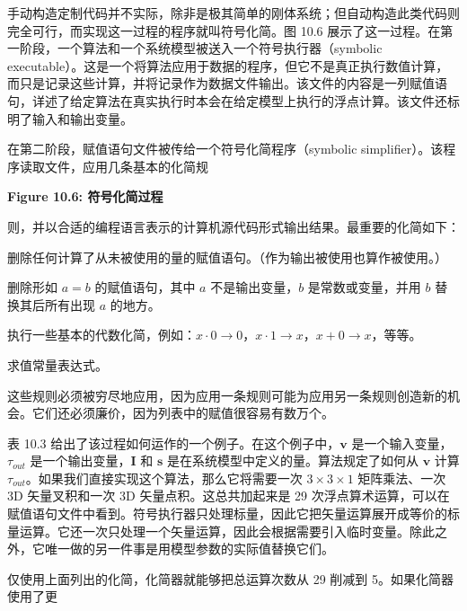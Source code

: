 \documentclass[10pt,a4paper]{book}
\theoremstyle{thmstyle} %
\theoremstyle{defstyle} %
\theoremstyle{prostyle} %
\begin{document}
手动构造定制代码并不实际，除非是极其简单的刚体系统；但自动构造此类代码则完全可行，而实现这一过程的程序就叫符号化简。图 10.6 展示了这一过程。在第一阶段，一个算法和一个系统模型被送入一个符号执行器（symbolic executable）。这是一个将算法应用于数据的程序，但它不是真正执行数值计算，而只是记录这些计算，并将记录作为数据文件输出。该文件的内容是一列赋值语句，详述了给定算法在真实执行时本会在给定模型上执行的浮点计算。该文件还标明了输入和输出变量。



在第二阶段，赋值语句文件被传给一个符号化简程序（symbolic simplifier）。该程序读取文件，应用几条基本的化简规



\noindent\textbf{Figure 10.6: 符号化简过程}





则，并以合适的编程语言表示的计算机源代码形式输出结果。最重要的化简如下：



删除任何计算了从未被使用的量的赋值语句。（作为输出被使用也算作被使用。）



删除形如 $a=b$ 的赋值语句，其中 $a$ 不是输出变量，$b$ 是常数或变量，并用 $b$ 替换其后所有出现 $a$ 的地方。



执行一些基本的代数化简，例如：$x\cdot0\to0$，$x\cdot1\to x$，$x+0\to x$，等等。



求值常量表达式。



这些规则必须被穷尽地应用，因为应用一条规则可能为应用另一条规则创造新的机会。它们还必须廉价，因为列表中的赋值很容易有数万个。



表 10.3 给出了该过程如何运作的一个例子。在这个例子中，$\boldsymbol{v}$ 是一个输入变量，$\tau_{out}$ 是一个输出变量，$\boldsymbol{I}$ 和 $\boldsymbol{s}$ 是在系统模型中定义的量。算法规定了如何从 $\boldsymbol{v}$ 计算 $\tau_{out}$。如果我们直接实现这个算法，那么它将需要一次 $3 \times 3 \times 1$ 矩阵乘法、一次 3D 矢量叉积和一次 3D 矢量点积。这总共加起来是 29 次浮点算术运算，可以在赋值语句文件中看到。符号执行器只处理标量，因此它把矢量运算展开成等价的标量运算。它还一次只处理一个矢量运算，因此会根据需要引入临时变量。除此之外，它唯一做的另一件事是用模型参数的实际值替换它们。



仅使用上面列出的化简，化简器就能够把总运算次数从 29 削减到 5。如果化简器使用了更
\end{document}
